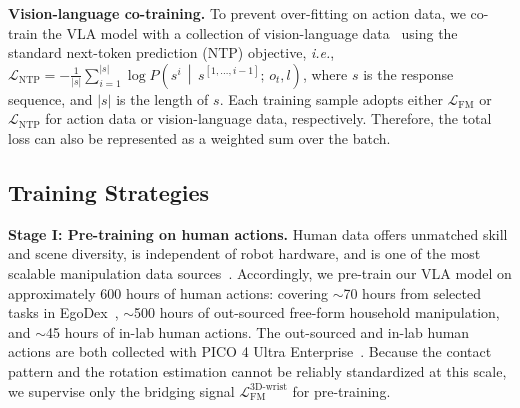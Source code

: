 \documentclass{llmxive}
\providecommand{\myparagraph}[1]{\vspace{0.1em}\noindent\textbf{#1}}
\begin{document}
\myparagraph{Vision-language co-training.}
%
To prevent over-fitting on action data, we co-train the VLA model with a collection of vision-language data~\cite{cheang2025gr3,intelligence2025pi_0.5,zitkovich2023rt2} using the standard next-token prediction (NTP) objective, \textit{i.e.}, 
%
$\mathcal{L}_{\text{NTP}} = - \frac{1}{|s|}\sum\nolimits_{i=1}^{|s|} \log P\!\left(s^{i} \,\middle\vert\, s^{[1, \dots, i-1]};\, o_{t}, l\right)$,
% 
where $s$ is the response sequence, and $|s|$ is the length of $s$.
%
Each training sample adopts either $\mathcal{L}_{\text{FM}}$ or $\mathcal{L}_{\text{NTP}}$ for action data or vision-language data, respectively.
% 
Therefore, the total loss can also be represented as a weighted sum over the batch.



\subsection{Training Strategies}
% 
\label{sec:method:strategy}


\myparagraph{Stage I: Pre-training on human actions.}
%
Human data offers unmatched skill and scene diversity, is independent of robot hardware, and is one of the most scalable manipulation data sources~\cite{hoque2025egodex,grauman2022ego4d,zheng2026egoscale}.
%
Accordingly, we pre-train our VLA model on approximately 600 hours of human actions: covering $\sim$70 hours from selected tasks in EgoDex~\cite{hoque2025egodex}, $\sim$500 hours of out-sourced free-form household manipulation, and $\sim$45 hours of in-lab human actions.
% 
The out-sourced and in-lab human actions are both collected with PICO 4 Ultra Enterprise~\cite{cheang2025gr3}.
% 
Because the contact pattern and the rotation estimation cannot be reliably standardized at this scale, we supervise only the bridging signal $\mathcal{L}_{\text{FM}}^{\text{3D-wrist}}$ for pre-training.
\end{document}
